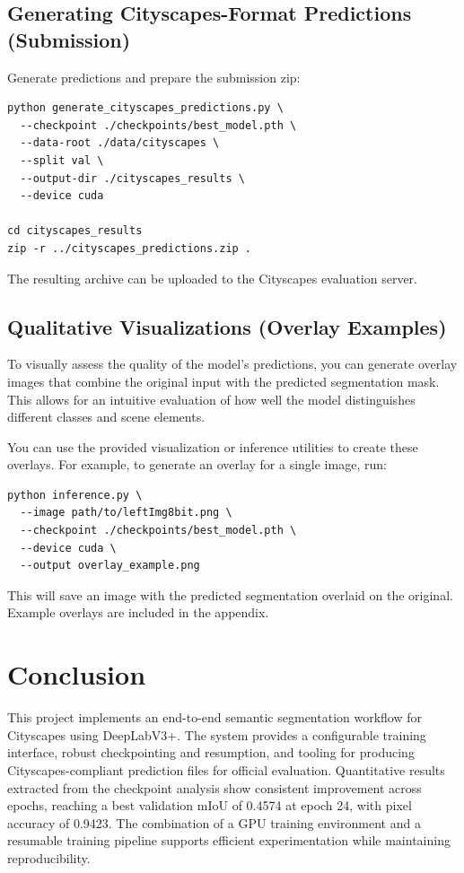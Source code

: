 \documentclass[conference]{IEEEtran}
\begin{document}
\subsection{Generating Cityscapes-Format Predictions (Submission)}
Generate predictions and prepare the submission zip:
\begin{lstlisting}
python generate_cityscapes_predictions.py \
  --checkpoint ./checkpoints/best_model.pth \
  --data-root ./data/cityscapes \
  --split val \
  --output-dir ./cityscapes_results \
  --device cuda

cd cityscapes_results
zip -r ../cityscapes_predictions.zip .
\end{lstlisting}
The resulting archive can be uploaded to the Cityscapes evaluation server.

\subsection{Qualitative Visualizations (Overlay Examples)}
To visually assess the quality of the model's predictions, you can generate overlay images that combine the original input with the predicted segmentation mask. This allows for an intuitive evaluation of how well the model distinguishes different classes and scene elements.

You can use the provided visualization or inference utilities to create these overlays. For example, to generate an overlay for a single image, run:
\begin{lstlisting}
python inference.py \
  --image path/to/leftImg8bit.png \
  --checkpoint ./checkpoints/best_model.pth \
  --device cuda \
  --output overlay_example.png
\end{lstlisting}
This will save an image with the predicted segmentation overlaid on the original. Example overlays are included in the appendix.

\section{Conclusion}
\label{sec:conclusion}
This project implements an end-to-end semantic segmentation workflow for Cityscapes using DeepLabV3+. The system provides a configurable training interface, robust checkpointing and resumption, and tooling for producing Cityscapes-compliant prediction files for official evaluation. Quantitative results extracted from the checkpoint analysis show consistent improvement across epochs, reaching a best validation mIoU of 0.4574 at epoch 24, with pixel accuracy of 0.9423. The combination of a GPU training environment and a resumable training pipeline supports efficient experimentation while maintaining reproducibility.
\end{document}
